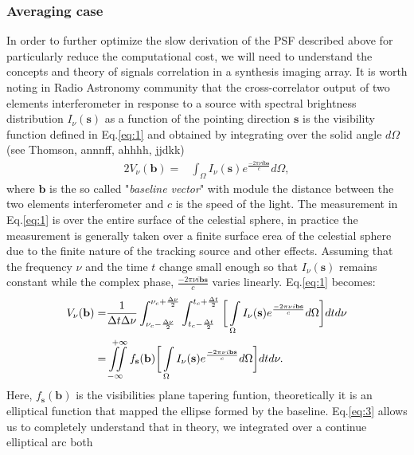 \subsubsection{Averaging case}
In order to further optimize the slow derivation of the PSF described above for particularly reduce the computational
cost, we will need to understand the concepts and theory of signals correlation in a synthesis imaging array.
It is worth noting in Radio Astronomy community that the cross-correlator output of two elements interferometer
in response to a source with spectral brightness distribution $I_{\nu}(\mathbf{s})$ as a function of the pointing direction $\mathbf{s}$ 
is the visibility function defined in Eq.\ref{eq:1} and obtained by integrating
over the solid angle $d\Omega$ (see Thomson, annnff, ahhhh, jjdkk)
\begin{alignat}{2}
V_{\nu}(\mathbf{b}) =& \int_{\Omega}I_{\nu}(\mathbf{s})e^{\frac{-2\pi\nu i \mathbf{b}\mathbf{s}}{c}}d\Omega, \label{eq:1}
\end{alignat}
where $\mathbf{b}$  is the so called "\textit{baseline vector}" with module the distance between the two elements
interferometer and $c$ is the speed of the light. The measurement in Eq.\ref{eq:1} is over the entire 
surface of the celestial sphere, in practice the measurement is generally taken over a finite surface erea of 
the celestial sphere due to the  
finite nature of the tracking source and other effects. Assuming that the frequency $\nu$ and the 
time $t$ change small  enough so that $I_{\nu}(\mathbf{s})$
remains constant while the complex phase, $\frac{-2\pi\nu i \mathbf{b}\mathbf{s}}{c}$ varies linearly.   Eq.\ref{eq:1} becomes:
\begin{alignat}{2}
V_{\nu}(\mathbf{b}) =& \frac{1}{\Delta t \Delta \nu}\int_{\nu_c - \frac{\Delta \nu}{2}}^{\nu_c + \frac{\Delta \nu}{2}}\int_{t_c - \frac{\Delta t}{2}}^{t_c + \frac{\Delta t}{2}}\bigg[\int\limits_{\Omega}^{}I_{\nu}(\mathbf{s})e^{\frac{-2\pi\nu i \mathbf{b}\mathbf{s}}{c}} d\Omega\bigg] dt d\nu \label{eq:2}\\	    
		    =& \iint\limits_{-\infty}^{\hspace{.3cm}+\infty}f_{\mathbf{s}}(\mathbf{b})\bigg[\int\limits_{\Omega}^{}I_{\nu}(\mathbf{s})e^{\frac{-2\pi\nu i \mathbf{b}\mathbf{s}}{c}}d\Omega \bigg]dt d\nu  \label{eq:3}.
\end{alignat}
Here, $f_{\mathbf{s}}(\mathbf{b})$ is the visibilities plane tapering funtion, theoretically it is an elliptical function that
mapped the ellipse formed by the baseline.
Eq.\ref{eq:3} allows us to completely understand that in theory, we integrated over a continue elliptical arc both
